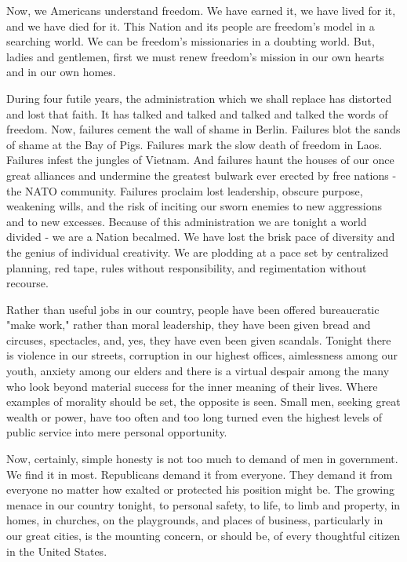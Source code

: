 \documentclass{article}
\begin{document}
Now, we Americans understand freedom. We have earned it, we have lived for it,
and we have died for it. This Nation and its people are freedom's model in a
searching world. We can be freedom's missionaries in a doubting world. But,
ladies and gentlemen, first we must renew freedom's mission in our own hearts
and in our own homes.

During four futile years, the administration which we shall replace has
distorted and lost that faith. It has talked and talked and talked and talked
the words of freedom. Now, failures cement the wall of shame in Berlin.
Failures blot the sands of shame at the Bay of Pigs. Failures mark the slow
death of freedom in Laos. Failures infest the jungles of Vietnam. And failures
haunt the houses of our once great alliances and undermine the greatest bulwark
ever erected by free nations - the NATO community. Failures proclaim lost
leadership, obscure purpose, weakening wills, and the risk of inciting our
sworn enemies to new aggressions and to new excesses. Because of this
administration we are tonight a world divided - we are a Nation becalmed. We
have lost the brisk pace of diversity and the genius of individual creativity.
We are plodding at a pace set by centralized planning, red tape, rules without
responsibility, and regimentation without recourse.

Rather than useful jobs in our country, people have been offered bureaucratic
"make work," rather than moral leadership, they have been given bread and
circuses, spectacles, and, yes, they have even been given scandals. Tonight
there is violence in our streets, corruption in our highest offices,
aimlessness among our youth, anxiety among our elders and there is a virtual
despair among the many who look beyond material success for the inner meaning
of their lives. Where examples of morality should be set, the opposite is seen.
Small men, seeking great wealth or power, have too often and too long turned
even the highest levels of public service into mere personal opportunity.

Now, certainly, simple honesty is not too much to demand of men in government.
We find it in most. Republicans demand it from everyone. They demand it from
everyone no matter how exalted or protected his position might be. The growing
menace in our country tonight, to personal safety, to life, to limb and
property, in homes, in churches, on the playgrounds, and places of business,
particularly in our great cities, is the mounting concern, or should be, of
every thoughtful citizen in the United States.
\end{document}
